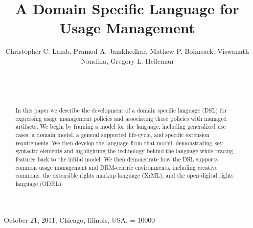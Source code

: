 \documentclass{sig-alternate-11pt}
\begin{document}
\title{A Domain Specific Language for Usage Management}


\author{
\alignauthor
Christopher C. Lamb, Pramod A. Jamkhedkar, Mathew P. Bohnsack, Viswanath Nandina, Gregory L. Heileman \\
       \\
       \\
       \\
}

 {October 21, 2011, Chicago, Illinois, USA.} 
\widowpenalty = 10000

\maketitle

\begin{abstract}
In this paper we describe the development of a domain specific language (DSL) for expressing usage management policies and associating those policies with managed artifacts.  We begin by framing a model for the language, including generalized use cases, a domain model, a general supported life-cycle, and specific extension requirements.  We then develop the language from that model, demonstrating key syntactic elements and highlighting the technology behind the language while tracing features back to the initial model.  We then demonstrate how the DSL supports common usage management and DRM-centric environments, including creative commons, the extensible rights markup language (XrML), and the open digital rights language (ODRL).
\end{abstract}







\end{document}

